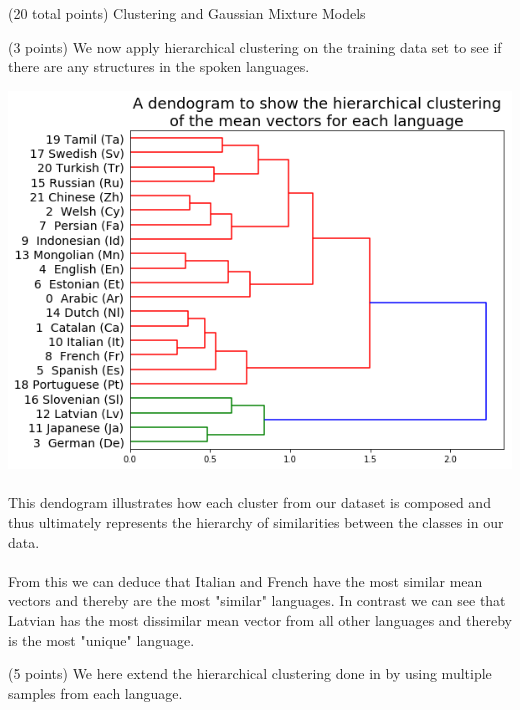 \documentclass[12pt]{article}
\begin{document}
\begin{question}{(20 total points) Clustering and Gaussian Mixture Models}
\begin{subquestion}{(3 points)
       We now apply hierarchical clustering on the training data set
       to see if there are any structures in the spoken languages.
     }
     

      \begin{answerbox}{52em}
        \includegraphics[width=1\textwidth]{images/q33.png}
        \\
        \\
        This dendogram illustrates how each cluster from our dataset is composed and thus ultimately represents the hierarchy of similarities between the classes in our data.\\
        \\
        From this we can deduce that Italian and French have the most similar mean vectors and thereby are the most "similar" languages. In contrast we can see that Latvian has the most dissimilar mean vector from all other languages and thereby is the most "unique" language.
      \end{answerbox}
  


   \end{subquestion}
   \begin{subquestion}{(5 points)
       We here extend the hierarchical clustering done in  by
       using multiple samples from each language.
     } \label{Q3.4}


   


\end{subquestion}
\end{question}
\end{document}
